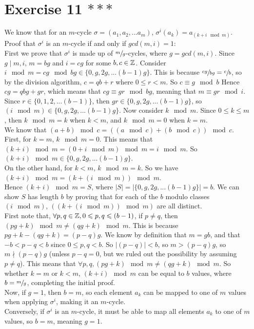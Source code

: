 \documentclass[12pt]{article}
\begin{document}
    \section*{Exercise 11 $***$}
    We know that for an $m$-cycle $\sigma = (a_1, a_2, ... a_m)$,
    $\sigma^i(a_k) = a_{(k+i \mod m)}$.
    Proof that $\sigma^i$ is an $m$-cycle
    if and only if $gcd(m, i) = 1$: \\
    First we prove that $\sigma^i$ is made up of $\sfrac{m}{g}$-cycles,
    where $g = gcd(m, i)$.
    Since $g \mid m, i$, $m = bg$ and $i = cg$ for some $b,c \in \mathbb{Z}$.
    Consider $i \mod m = cg \mod bg \in \{0, g, 2g, ... (b-1)g\}$.
    This is because $\sfrac{cg}{bg} = \sfrac{c}{b}$,
    so by the division algorithm, $c = qb + r$
    where $0 \leqslant r < m$.
    So $c \equiv g \mod b$
    Hence $cg = qbg + gr$,
    which means that $cg \equiv gr \mod bg$, 
    meaning that $m \equiv gr \mod i$.
    Since $r \in \{0, 1, 2, ... (b-1)\}$,
    then $gr \in \{0, g, 2g, ... (b-1)g\}$,
    so $(i \mod m) \in \{0, g, 2g, ... (b-1)g\}$.
    Now consider $k \mod m$.
    Since $0 \leqslant k \leqslant m$,
    then $k \mod m = k$ when $k < m$,
    and $k \mod m = 0$ when $k = m$. \\
    We know that $(a + b) \mod c = ((a \mod c )+ (b \mod c)) \mod c$. \\
    First, for $k = m$, $k \mod m = 0$.
    This means that $(k+i) \mod m = (0 + i \mod m) \mod m = i \mod m$.
    So $(k+i) \mod m \in \{0, g, 2g, ... (b-1)g\}$. \\
    On the other hand, for $k < m$, $k \mod m = k$.
    So we have $(k + i) \mod m = (k + (i \mod m)) \mod m$. \\
    Hence $(k + i) \mod m = S$,
    where $|S| = |\{0, g, 2g, ... (b-1)g\}| = b$.
    We can show $S$ has length $b$ by proving that for each of the
    $b$ modulo classes $(i \mod m)$,  
    $((k + (i \mod m)) \mod m)$ are all distinct.  \\
    First note that, $\forall p, q \in \mathbb{Z}, 0 \leqslant p, q \leqslant (b-1)$,
    if $p \neq q$, then $(pg + k) \mod m \neq (qg + k) \mod m$. 
    This is because $pg + k - (qg + k) = (p - q)g$.
    We know by definition that  $m = gb$, and that $-b < p - q < b$
    since $0 \leqslant p, q < b$. So $|(p-q)| < b$,
    so $m > (p - q)g$,
    so $m \nmid (p - q)g$
    (unless $p - q = 0$, but we ruled out the possibility by assuming
    $p \neq q$).
    This means that $\forall p, q, (pg + k) \mod m \neq (qg + k) \mod m$.
    So whether $k = m$ or $k < m$,
    $(k + i) \mod m$ can be equal to $b$ values,
    where $b = \sfrac{m}{g}$, completing the initial proof. \\ 
    Now, if $g = 1$, then $b = m$, so each element $a_k$ can be mapped to
    one of $m$ values when applying $\sigma^i$, making it an $m$-cycle. \\ 
    Conversely, if $\sigma^i$ is an $m$-cycle, it must be able to map all
    elements $a_k$ to one of $m$ values, so $b = m$, meaning $g = 1$. 
\end{document}
